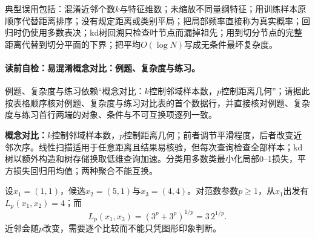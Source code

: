 \begin{warningbox}
典型误用包括：混淆近邻个数$k$与特征维数；未缩放不同量纲特征；用训练样本原顺序代替距离排序；没有规定距离或类别平局；把局部频率直接称为真实概率；回归时仍使用多数表决；kd树回溯只检查叶节点而漏掉祖先；用到切分节点的完整距离代替到切分平面的下界；把平均$O(\log N)$写成无条件最坏复杂度。
\end{warningbox}

\label{struct:V2-C02-CH31}
\paragraph{读前自检：易混淆概念对比：例题、复杂度与练习。}例题、复杂度与练习依赖“概念对比：$k$控制邻域样本数，$p$控制距离几何”；请据此按表格顺序核对例题、复杂度与练习对比表的首个数据行，并直接核对例题、复杂度与练习首行两端的对象、条件与不可互换项逐列一致。\par

\begin{comparisonbox}
\textbf{概念对比：}$k$控制邻域样本数，$p$控制距离几何；前者调节平滑程度，后者改变近邻次序。线性扫描适用于任意距离且结果易核验，但每次查询检查全部样本；kd树以额外构造和树存储换取低维查询加速。分类用多数类最小化局部0--1损失，平方损失回归用均值；两种聚合不能互换。
\end{comparisonbox}

\label{struct:V2-C02-CH32}
\begin{example}[不同$L_p$距离下的最近邻]\label{exm:V2-C02-original-distance}
设$x_1=(1,1)$，候选$x_2=(5,1)$与$x_3=(4,4)$。对范数参数$p\geq 1$，从$x_1$出发有$L_p(x_1,x_2)=4$；而
\[
L_p(x_1,x_3)=(3^p+3^p)^{1/p}=3\,2^{1/p}.
\]
近邻会随$p$改变，需要逐个比较而不能只凭图形印象判断。
\end{example}

